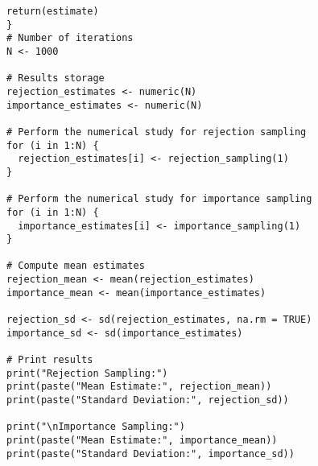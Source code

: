 \begin{tcolorbox}[colback=white!95!black,colframe=white!50!black, breakable]
\begin{lstlisting}[caption={Exercise 1e}, label={lst:compare}]
  return(estimate)
}
# Number of iterations
N <- 1000

# Results storage
rejection_estimates <- numeric(N)
importance_estimates <- numeric(N)

# Perform the numerical study for rejection sampling
for (i in 1:N) {
  rejection_estimates[i] <- rejection_sampling(1)
}

# Perform the numerical study for importance sampling
for (i in 1:N) {
  importance_estimates[i] <- importance_sampling(1)
}

# Compute mean estimates
rejection_mean <- mean(rejection_estimates)
importance_mean <- mean(importance_estimates)

rejection_sd <- sd(rejection_estimates, na.rm = TRUE)
importance_sd <- sd(importance_estimates)

# Print results
print("Rejection Sampling:")
print(paste("Mean Estimate:", rejection_mean))
print(paste("Standard Deviation:", rejection_sd))

print("\nImportance Sampling:")
print(paste("Mean Estimate:", importance_mean))
print(paste("Standard Deviation:", importance_sd))
\end{lstlisting}
\end{tcolorbox}
\vspace{15mm}
